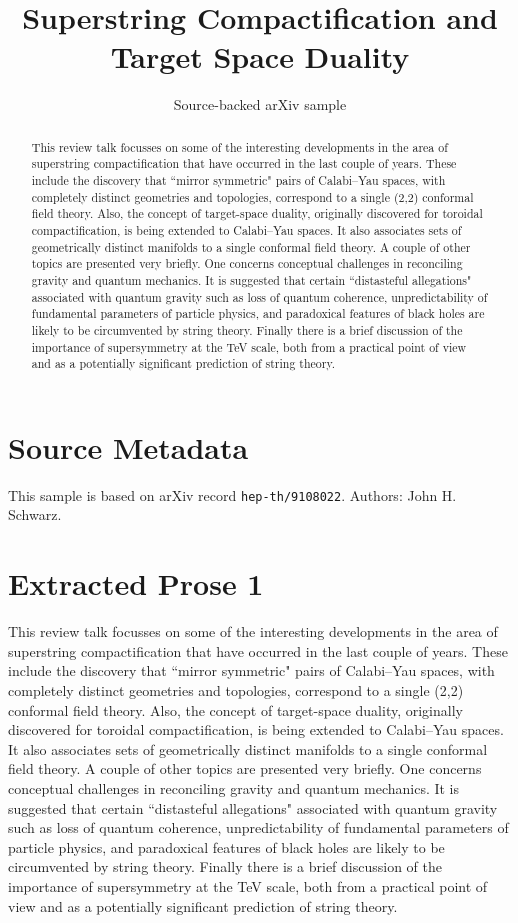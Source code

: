\documentclass[11pt]{article}
\title{Superstring Compactification and Target Space Duality}
\author{Source-backed arXiv sample}
\date{}
\begin{document}
\maketitle
\begin{abstract}
This review talk focusses on some of the interesting developments in the area of superstring compactification that have occurred in the last couple of years. These include the discovery that ``mirror symmetric" pairs of Calabi--Yau spaces, with completely distinct geometries and topologies, correspond to a single (2,2) conformal field theory. Also, the concept of target-space duality, originally discovered for toroidal compactification, is being extended to Calabi--Yau spaces. It also associates sets of geometrically distinct manifolds to a single conformal field theory. A couple of other topics are presented very briefly. One concerns conceptual challenges in reconciling gravity and quantum mechanics. It is suggested that certain ``distasteful allegations" associated with quantum gravity such as loss of quantum coherence, unpredictability of fundamental parameters of particle physics, and paradoxical features of black holes are likely to be circumvented by string theory. Finally there is a brief discussion of the importance of supersymmetry at the TeV scale, both from a practical point of view and as a potentially significant prediction of string theory.
\end{abstract}
\section{Source Metadata}
This sample is based on arXiv record \texttt{hep-th/9108022}. Authors: John H. Schwarz.
\section{Extracted Prose 1}
This review talk focusses on some of the interesting developments in the area of superstring compactification that have occurred in the last couple of years. These include the discovery that ``mirror symmetric" pairs of Calabi--Yau spaces, with completely distinct geometries and topologies, correspond to a single (2,2) conformal field theory. Also, the concept of target-space duality, originally discovered for toroidal compactification, is being extended to Calabi--Yau spaces. It also associates sets of geometrically distinct manifolds to a single conformal field theory. A couple of other topics are presented very briefly. One concerns conceptual challenges in reconciling gravity and quantum mechanics. It is suggested that certain ``distasteful allegations" associated with quantum gravity such as loss of quantum coherence, unpredictability of fundamental parameters of particle physics, and paradoxical features of black holes are likely to be circumvented by string theory. Finally there is a brief discussion of the importance of supersymmetry at the TeV scale, both from a practical point of view and as a potentially significant prediction of string theory.
\end{document}
